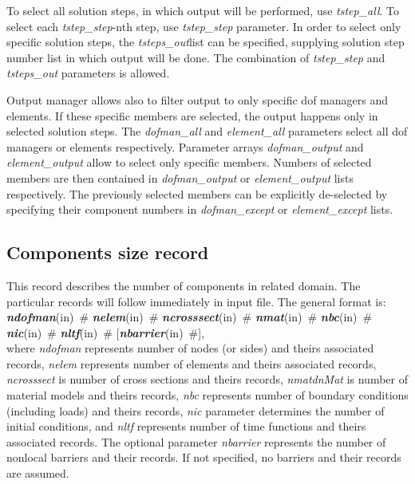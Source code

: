 \documentclass[draft]{article}
\newcommand{\param}[1]{{\em #1}}
\newcommand{\keywordnotype}[1]{\mbox{{\it{\bf{#1}}}}}
\newcommand{\keyword}[2]{\mbox{{\keywordnotype{#1}\tiny (#2)}}}
\newcommand{\field}[2]{\mbox{\keyword{#1}{#2}~\#}}
\newcommand{\optField}[2]{\mbox{[\field{#1}{#2}]}}
\begin{document}
To select all solution steps, in which output will be performed, use
\param{tstep\_all}. To select each \param{tstep\_step}-nth step, use
\param{tstep\_step} parameter. In order to select only specific
solution steps, the \param{tsteps\_out}list can be specified,
supplying solution step number list in which output will be done.
The combination of \param{tstep\_step} and
\param{tsteps\_out} parameters is allowed. 

Output manager allows also to filter output to only specific dof
managers and elements. If these specific members are selected, the
output happens only in selected solution steps. 
The \param{dofman\_all} and \param{element\_all} parameters select
all dof managers or elements respectively. Parameter arrays
\param{dofman\_output} and \param{element\_output} allow to select
only specific members. Numbers of selected members are then contained
in \param{dofman\_output} or \param{element\_output} lists
respectively. The previously selected members can be explicitly
de-selected by specifying their component numbers in \param{dofman\_except} or
\param{element\_except} lists.



\subsection{Components size record}
\label{_ComponentsSizeRecord}
This record describes the number of components in related domain. The
particular records will follow immediately in input file. The general format is:\\
\field{ndofman}{in}  \field{nelem}{in}
\field{ncrosssect}{in}  \field{nmat}{in}  \field{nbc}{in} \field{nic}{in}
\field{nltf}{in} \optField{nbarrier}{in},\\

where \param{ndofman} represents number of nodes (or sides) and theirs associated  records,
\param{nelem} represents number of elements and theirs associated records, \param{ncrosssect} is
number of cross sections and theirs records, \param{nmatdnMat}{} is number of material
models and theirs records, \param{nbc}{} represents number of boundary
conditions (including loads) and theirs
records, \param{nic} parameter determines the number of initial
conditions, and \param{nltf} represents number of time functions and
theirs associated records. The optional parameter \param{nbarrier}
represents the number of nonlocal barriers and their records. If not
specified, no barriers and their records are assumed.
\end{document}
